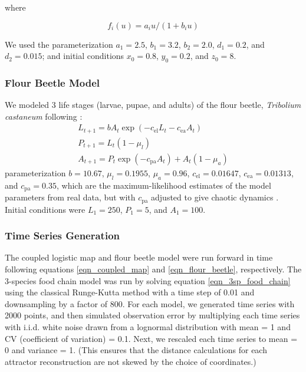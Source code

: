 where

\begin{equation*}
f_i(u) = a_i u / \left(1+b_i u \right)
\end{equation*}

We used the parameterization $a_1 = 2.5$, $b_1 = 3.2$, $b_2 = 2.0$, $d_1 = 0.2$, and $d_2 = 0.015$; and initial conditions $x_0 = 0.8$, $y_0 = 0.2$, and $z_0 = 8$.

\subsubsection{Flour Beetle Model}

We modeled 3 life stages (larvae, pupae, and adults) of the flour beetle, \emph{Tribolium castaneum} following \cite{Dennis_2001}:
\begin{equation}
\label{eqn_flour_beetle}
\begin{array}{rl}
L_{t+1} = b A_t \exp{\left(-c_\textrm{el}L_t - c_\text{ea}A_t\right)}\\
P_{t+1} = L_t \left(1 - \mu_l\right)\\
A_{t+1} = P_t \exp{\left(-c_\textrm{pa}A_t\right) + A_t\left(1 - \mu_a\right)}
\end{array}
\end{equation}
parameterization $b = 10.67$, $\mu_l = 0.1955$, $\mu_a = 0.96$, $c_\textrm{el} = 0.01647$, $c_\textrm{ea} = 0.01313$, and $c_\textrm{pa} = 0.35$, which are the maximum-likelihood estimates of the model parameters from real data, but with $c_\textrm{pa}$ adjusted to give chaotic dynamics \cite{Dennis_2001}. Initial conditions were $L_1 = 250$, $P_1 = 5$, and $A_1 = 100$.

\subsubsection{Time Series Generation}

The coupled logistic map and flour beetle model were run forward in time following equations \ref{eqn_coupled_map} and \ref{eqn_flour_beetle}, respectively. The 3-species food chain model was run by solving equation \ref{eqn_3sp_food_chain} using the classical Runge-Kutta method with a time step of 0.01 and downsampling by a factor of 800. For each model, we generated time series with 2000 points, and then simulated observation error by multiplying each time series with i.i.d. white noise drawn from a lognormal distribution with mean = 1 and CV (coefficient of variation) = 0.1. Next, we rescaled each time series to mean = 0 and variance = 1. (This ensures that the distance calculations for each attractor reconstruction are not skewed by the choice of coordinates.)

